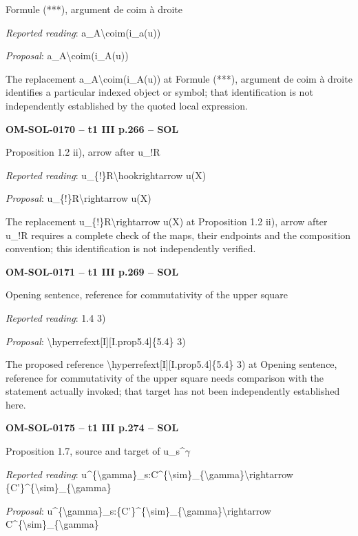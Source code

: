 Formule (***), argument de coim à droite\par
\emph{Reported reading}: a\_A\textbackslash{}coim(i\_a(u))\par
\emph{Proposal}: a\_A\textbackslash{}coim(i\_A(u))\par
The replacement a\_A\textbackslash{}coim(i\_A(u)) at Formule (***), argument de coim à droite identifies a particular indexed object or symbol; that identification is not independently established by the quoted local expression.\par
\par\noindent\textbf{OM-SOL-0170 -- t1 III p.266 -- SOL}\par
Proposition 1.2 ii), arrow after u\_!R\par
\emph{Reported reading}: u\_\{!\}R\textbackslash{}hookrightarrow u(X)\par
\emph{Proposal}: u\_\{!\}R\textbackslash{}rightarrow u(X)\par
The replacement u\_\{!\}R\textbackslash{}rightarrow u(X) at Proposition 1.2 ii), arrow after u\_!R requires a complete check of the maps, their endpoints and the composition convention; this identification is not independently verified.\par
\par\noindent\textbf{OM-SOL-0171 -- t1 III p.269 -- SOL}\par
Opening sentence, reference for commutativity of the upper square\par
\emph{Reported reading}: 1.4 3)\par
\emph{Proposal}: \textbackslash{}hyperrefext[I][I.prop5.4]\{5.4\} 3)\par
The proposed reference \textbackslash{}hyperrefext[I][I.prop5.4]\{5.4\} 3) at Opening sentence, reference for commutativity of the upper square needs comparison with the statement actually invoked; that target has not been independently established here.\par
\par\noindent\textbf{OM-SOL-0175 -- t1 III p.274 -- SOL}\par
Proposition 1.7, source and target of u\_s\textasciicircum{}\ensuremath{\gamma}\par
\emph{Reported reading}: u\textasciicircum{}\{\textbackslash{}gamma\}\_s:C\textasciicircum{}\{\textbackslash{}sim\}\_\{\textbackslash{}gamma\}\textbackslash{}rightarrow \{C'\}\textasciicircum{}\{\textbackslash{}sim\}\_\{\textbackslash{}gamma\}\par
\emph{Proposal}: u\textasciicircum{}\{\textbackslash{}gamma\}\_s:\{C'\}\textasciicircum{}\{\textbackslash{}sim\}\_\{\textbackslash{}gamma\}\textbackslash{}rightarrow C\textasciicircum{}\{\textbackslash{}sim\}\_\{\textbackslash{}gamma\}\par
